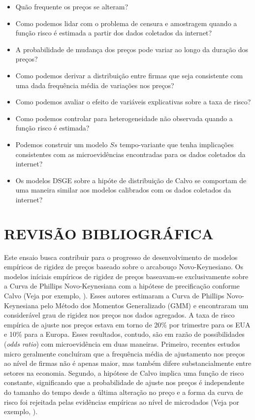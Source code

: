\documentclass[twoside,a4paper,11pt]{report}
\begin{document}
\begin{itemize}
  \item Quão frequente os preços se alteram?
  \item Como podemos lidar com o problema de censura e amostragem quando a função risco é estimada a partir dos dados coletados da internet?
  \item A probabilidade de mudança dos preços pode variar ao longo da duração dos preços?
  \item Como podemos derivar a distribuição entre firmas que seja consistente com uma dada frequência média de variações nos preços?
  \item Como podemos avaliar o efeito de variáveis explicativas sobre a taxa de risco?
  \item Como podemos controlar para heterogeneidade não observada quando a função risco é estimada?
  \item Podemos construir um modelo $Ss$ tempo-variante que tenha implicações consistentes com as microevidências encontradas para os dados coletados da internet?
  \item Os modelos DSGE sobre a hipóte de distribuição de Calvo se comportam de uma maneira similar aos modelos calibrados com os dados coletados da internet?
\end{itemize}


\pagestyle{empty}
\cleardoublepage
\pagestyle{fancy}

\chapter{REVISÃO BIBLIOGRÁFICA}\label{cap2en02}

Este ensaio busca contribuir para o progresso de desenvolvimento de modelos empíricos de rigidez de preços baseado sobre o arcabouço Novo-Keynesiano. Os modelos iníciais empíricos de rigidez de preços baseavam-se exclusivamente sobre a Curva de Phillips Novo-Keynesiana com a hipótese de precificação conforme Calvo (Veja por exemplo, \citet{gali1999inflation,gali2001european,sbordone2002prices}). Esses autores estimaram a Curva de Phillips Novo-Keynesiana pelo Método dos Momentos Generalizado (GMM) e encontraram um considerável grau de rigidez nos preços nos dados agregados. A taxa de risco empírica de ajuste nos preços estava em torno de 20\% por trimestre para os EUA e 10\% para a Europa. Esses resultados, contudo, são em razão de possibilidades (\emph{odds ratio}) com microevidência em duas maneiras. Primeiro, recentes estudos micro geralmente concluíram que a frequência média de ajustamento nos preços ao nível de firmas não é apenas maior, mas também difere substancialmente entre setores na economia. Segundo, a hipótese de Calvo implica uma função de risco constante, significando que a probabilidade de ajuste nos preços é independente do tamanho do tempo desde a última alteração no preço e a forma da curva de risco foi rejeitada pelas evidências empíricas ao nível de microdados (Veja por exemplo, \citet{cecchetti1986frequency,campbell2005rigid,nakamura2008five}). 
\end{document}
